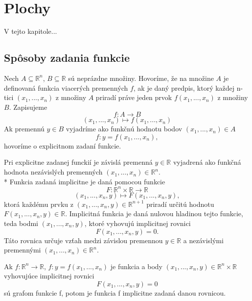 \chapter{Plochy}

\label{kap:plochy} %

V tejto kapitole...

\section{Spôsoby zadania funkcie}

\begin{definition}
    Nech $A \subseteq \mathbb{R}^n$, $B \subseteq \mathbb{R}$ sú neprázdne množiny. 
Hovoríme, že na množine $A$ je definovaná funkcia viacerých premenných
$f$, ak je daný predpis, ktorý každej n-tici $(x_1, . . . , x_n)$
z množiny $A$ priradí práve jeden prvok $f(x_1, . . . , x_n)$ z množiny $B$.
Zapisujeme 
$$f : A \to B$$
$$(x_1, . . . , x_n) \mapsto f(x_1, . . . , x_n)$$
Ak premennú $y \in B$ vyjadríme ako funkčnú hodnotu bodov $(x_1, . . . , x_n) \in A$
$$f : y = f(x_1, . . . , x_n),$$
hovoríme o explicitnom zadaní funkcie.
\end{definition}


Pri explicitne zadanej funckií je závislá premenná $y \in \mathbb{R}$ vyjadrená ako funkčná hodnota nezávislých
premenných $(x_1, . . . , x_n) \in \mathbb{R}^n$.
\\*
Funkcia zadaná implicitne je daná pomocou funkcie $$F : \mathbb{R}^n \times \mathbb{R} \to \mathbb{R}$$
$$(x_1, . . . ,x_n, y) \mapsto F(x_1, . . . , x_n, y),$$ ktorá každému prvku z $(x_1, . . . ,x_n, y) \in \mathbb{R}^{n+1}$ 
priradí určitú hodnotu $F(x_1, . . . , x_n, y) \in \mathbb{R}$. 
Implicitná funkcia je daná nulovou hladinou tejto funkcie, teda bodmi $(x_1, . . . , x_n, y)$, 
ktoré vyhovujú implicitnej rovnici $$F(x_1, . . . , x_n, y) = 0.$$  
Táto rovnica určuje vzťah medzi závislou premennou $y \in \mathbb{R}$
a nezávislými premennými $(x_1, . . . , x_n) \in \mathbb{R}^n$. 

\begin{note}
    Ak $f : \mathbb{R}^n \to \mathbb{R}$, $f: y = f(x_1, . . . , x_n)$ je funkcia a body
    $(x_1, . . . , x_n, y) \in \mathbb{R}^n \times \mathbb{R}$ vyhovujúce implicitnej rovnici 
    $$F(x_1, . . . , x_n, y) = 0$$
    sú grafom funkcie f,
    potom je funkcia f implicitne zadaná danou rovnicou.
\end{note}

